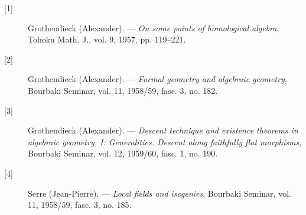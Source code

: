 \begin{description}
  \item[{[1]}] Grothendieck (Alexander). --- \emph{On some points of
    homological algebra}, Tohoku Math. J., vol. 9, 1957, pp. 119--221.
  \item[{[2]}] Grothendieck (Alexander). --- \emph{Formal geometry and
    algebraic geometry}, Bourbaki Seminar, vol. 11, 1958/59, fasc. 3, no. 182.
  \item[{[3]}] Grothendieck (Alexander). --- \emph{Descent technique and
    existence theorems in algebraic geometry, I: Generalities. Descent along
    faithfully flat morphisms}, Bourbaki Seminar, vol. 12, 1959/60, fasc. 1,
    no. 190.
  \item[{[4]}] Serre (Jean-Pierre). --- \emph{Local fields and isogenies},
    Bourbaki Seminar, vol. 11, 1958/59, fasc. 3, no. 185.
\end{description}

\par\smallskip
\begingroup\footnotesize
\endgroup
